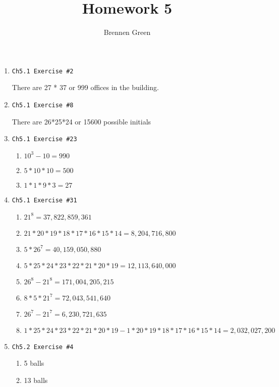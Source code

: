 \documentclass[11pt]{article}
\begin{document}
\title{Homework 5}
\author{Brennen Green}
\maketitle


\begin{enumerate}
    \item \begin{verbatim}Ch5.1 Exercise #2\end{verbatim} 
        There are 27 * 37 or 999 offices in the building.
    \item \begin{verbatim}Ch5.1 Exercise #8\end{verbatim} 
        There are 26*25*24 or 15600 possible initials
    \item \begin{verbatim}Ch5.1 Exercise #23\end{verbatim}
        \begin{enumerate}
            \item $10^3 - 10 = 990$
            \item $5 * 10 * 10 = 500$
            \item $1 * 1 * 9 * 3 = 27$
        \end{enumerate}
    \item \begin{verbatim}Ch5.1 Exercise #31\end{verbatim}
        \begin{enumerate}
            \item $21^8 = 37,822,859,361$
            \item $21*20*19*18*17*16*15*14 = 8,204,716,800$
            \item $5*26^7 = 40,159,050,880$
            \item $5*25*24*23*22*21*20*19 = 12,113,640,000$
            \item $ 26^8 - 21^8 = 171,004,205,215 $
            \item $ 8 * 5 * 21^7 = 72,043,541,640 $
            \item $ 26^7 - 21^7 = 6,230,721,635 $
            \item $ 1*25*24*23*22*21*20*19 - 1*20*19*18*17*16*15*14 = 2,032,027,200$
        \end{enumerate}
    \item \begin{verbatim}Ch5.2 Exercise #4\end{verbatim}
        \begin{enumerate}
            \item 5 balls
            \item 13 balls
        \end{enumerate}
    

\end{enumerate}
\end{document}
